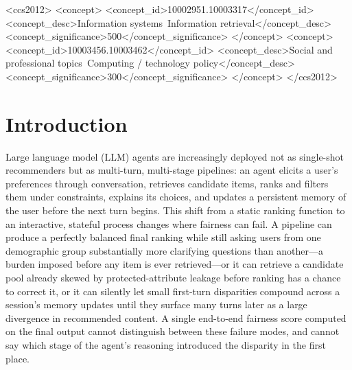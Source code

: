 \documentclass[manuscript,screen,review]{acmart}
\begin{document}
\begin{CCSXML}
<ccs2012>
  <concept>
    <concept_id>10002951.10003317</concept_id>
    <concept_desc>Information systems~Information retrieval</concept_desc>
    <concept_significance>500</concept_significance>
  </concept>
  <concept>
    <concept_id>10003456.10003462</concept_id>
    <concept_desc>Social and professional topics~Computing / technology policy</concept_desc>
    <concept_significance>300</concept_significance>
  </concept>
</ccs2012>
\end{CCSXML}



\maketitle

\section{Introduction}
\label{sec:intro}

Large language model (LLM) agents are increasingly deployed not as single-shot
recommenders but as multi-turn, multi-stage pipelines: an agent elicits a user's
preferences through conversation, retrieves candidate items, ranks and filters
them under constraints, explains its choices, and updates a persistent memory of
the user before the next turn begins. This shift from a static ranking function
to an interactive, stateful process changes where fairness can fail. A pipeline
can produce a perfectly balanced final ranking while still asking users from one
demographic group substantially more clarifying questions than another---a burden
imposed before any item is ever retrieved---or it can retrieve a candidate pool
already skewed by protected-attribute leakage before ranking has a chance to
correct it, or it can silently let small first-turn disparities compound across a
session's memory updates until they surface many turns later as a large
divergence in recommended content. A single end-to-end fairness score computed on
the final output cannot distinguish between these failure modes, and cannot say
which stage of the agent's reasoning introduced the disparity in the first place.
\end{document}
